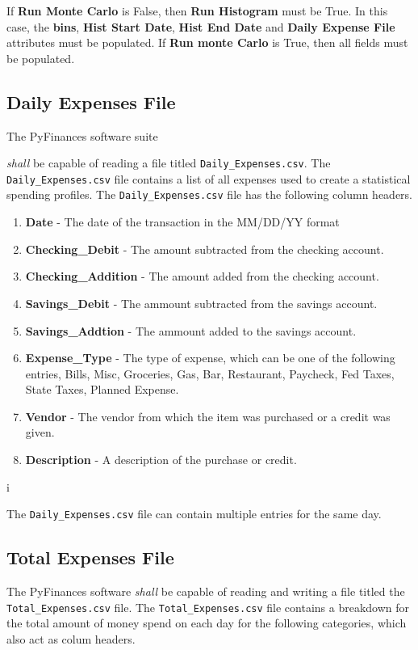 If {\textbf{Run Monte Carlo}} is False, then {\textbf{Run Histogram}} must be 
True.  In this case, the {\textbf{bins}}, {\textbf{Hist Start Date}}, 
{\textbf{Hist End Date}} and {\textbf{Daily Expense File}} attributes must be 
populated.  If {\textbf{Run monte Carlo}} is True, then all fields must be 
populated.

\subsection{Daily Expenses File}
\label{sec:dailyexpenses}
The PyFinances software suite {\textit{shall} be capable of reading a 
file titled {\texttt{Daily\_Expenses.csv}}.  The {\texttt{Daily\_Expenses.csv}} file
contains a list of all expenses used to create a statistical spending profiles.  
The {\texttt{Daily\_Expenses.csv}} file has the following column headers.

\begin{enumerate}
    \item {\textbf{Date}} - The date of the transaction in the MM/DD/YY format
    \item {\textbf{Checking\_Debit}} - The amount subtracted from the checking account.
    \item {\textbf{Checking\_Addition}} - The amount added from the checking account.
    \item {\textbf{Savings\_Debit}} - The ammount subtracted from the savings account.
    \item {\textbf{Savings\_Addtion}} - The ammount added to the savings account.
    \item {\textbf{Expense\_Type}} - The type of expense, which can be one of the following
	                             entries, Bills, Misc, Groceries, Gas, Bar, 
				     Restaurant, Paycheck, Fed Taxes, State Taxes, 
				     Planned Expense.
    \item {\textbf{Vendor}} - The vendor from which the item was purchased or a 
	                      credit was given.
    \item {\textbf{Description}} - A description of the purchase or credit.
\end{enumerate}i

\noindent The {\texttt{Daily\_Expenses.csv}} file can contain multiple entries for 
the same day.

\subsection{Total Expenses File}
\label{sec:totalexpenses}
The PyFinances software {\textit{shall}} be capable of reading and writing a 
file titled the {\texttt{Total\_Expenses.csv}} file.  The {\texttt{Total\_Expenses.csv}}
file contains a breakdown for the total amount of money spend on each day for the 
following categories, which also act as colum headers.

}
